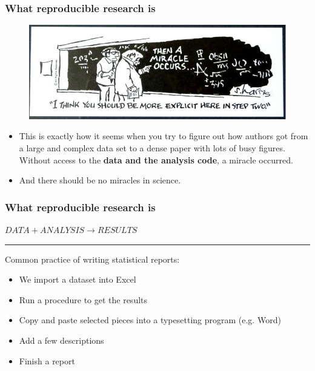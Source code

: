 \documentclass{beamer}
\begin{document}
\begin{frame}
\frametitle{What reproducible research is}
\begin{figure}
\includegraphics[scale=0.45]{figures/thenamiracleoccurs.jpg}
\end{figure}
\footnotesize
\begin{itemize}
	\item This is exactly how it seems when you try to figure out how authors got from a large and complex data set to a dense paper with lots of busy figures. \\Without access to the \textbf{data and the analysis code}, a miracle occurred.
\item And  there should be {\sc no miracles in science.} \citep{Markowetz:2016cs}
\end{itemize}
\end{frame}

\begin{frame}
\frametitle{What reproducible research is}
\Large\centering $DATA +  ANALYSIS \rightarrow RESULTS$\\
\rule{\textwidth}{0.05pt}\vspace{20px}
Common practice of writing statistical reports: 
\small\begin{itemize}
    \item We import a dataset into Excel
    \item Run a procedure to get the results
    \item Copy and paste selected pieces into a typesetting program (e.g. Word)
    \item Add a few descriptions
    \item Finish a report
\end{itemize}
\end{frame}
\end{document}
